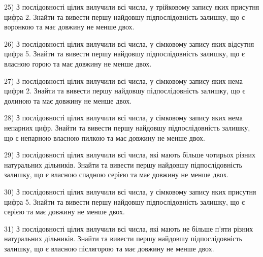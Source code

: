\documentclass[11pt, ukrainian]{article}
\begin{document}
\par
\vspace{0.9cm}
25) \space 
З послідовності цілих вилучили всі числа, у трійковому запису яких присутня цифра 2. Знайти та вивести першу найдовшу підпослідовність залишку, що є воронкою та має довжину не менше двох.

\par
\vspace{0.9cm}
26) \space 
З послідовності цілих вилучили всі числа, у сімковому запису яких відсутня цифра 5. Знайти та вивести першу найдовшу підпослідовність залишку, що є власною горою та має довжину не менше двох.

\par
\vspace{0.9cm}
27) \space 
З послідовності цілих вилучили всі числа, у сімковому запису яких нема цифри 2. Знайти та вивести першу найдовшу підпослідовність залишку, що є долиною та має довжину не менше двох.

\par
\vspace{0.9cm}
28) \space 
З послідовності цілих вилучили всі числа, у сімковому запису яких нема непарних цифр. Знайти та вивести першу найдовшу підпослідовність залишку, що є непарною власною пилкою та має довжину не менше двох.

\par
\vspace{0.9cm}
29) \space 
З послідовності цілих вилучили всі числа, які мають більше чотирьох різних натуральних дільників. Знайти та вивести першу найдовшу підпослідовність залишку, що є власною спадною серією та має довжину не менше двох.

\par
\vspace{0.9cm}
30) \space 
З послідовності цілих вилучили всі числа, у сімковому запису яких присутня цифра 5. Знайти та вивести першу найдовшу підпослідовність залишку, що є серією та має довжину не менше двох.

\par
\vspace{0.9cm}
31) \space 
З послідовності цілих вилучили всі числа, які мають не більше п'яти різних натуральних дільників. Знайти та вивести першу найдовшу підпослідовність залишку, що є власною післягорою та має довжину не менше двох.
\end{document}
